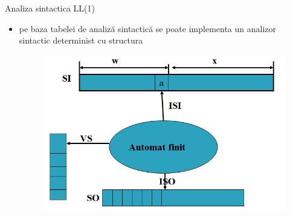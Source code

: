 \documentclass[pdf]{beamer}
\begin{document}
\begin{frame}{Analiza sintactica LL(1)}
\begin{itemize}
\item
pe baza tabelei de analiză sintactică se poate implementa un analizor sintactic determinist cu structura

\begin{figure}
\centering
\includegraphics[scale=0.7]{img/afsll1}
\end{figure}


\end{itemize}
\end{frame}
\end{document}
